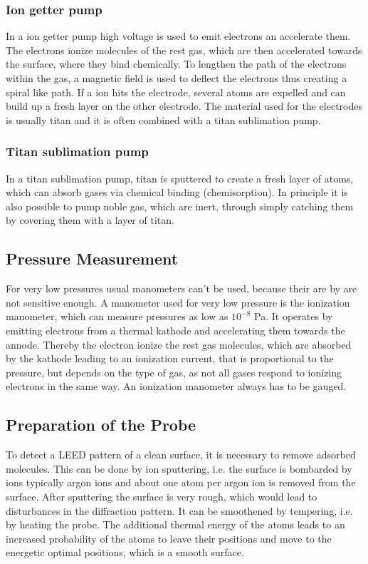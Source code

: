 \documentclass[a4paper]{scrartcl}
\numberwithin{equation}{section}
\numberwithin{figure}{section}
\numberwithin{table}{section}
\begin{document}
\subsubsection{Ion getter pump}
In a ion getter pump high voltage is used to emit electrons an accelerate them. The electrons ionize molecules of the rest gas, which are then accelerated towards the surface, where they bind chemically. To lengthen the path of the electrons within the gas, a magnetic field is used to deflect the electrons thus creating a spiral like path. If a ion hits the electrode, several atoms are expelled and can build up a fresh layer on the other electrode. The material used for the electrodes is usually titan and it is often combined with a titan sublimation pump.

\subsubsection{Titan sublimation pump}
In a titan sublimation pump, titan is sputtered to create a fresh layer of atoms, which can absorb gases via chemical binding (chemisorption). In principle it is also possible to pump noble gas, which are inert, through simply catching them by covering them with a layer of titan. 

\subsection{Pressure Measurement}
For very low pressures usual manometers can't be used, because their are by are not sensitive enough. A manometer used for very low pressure is the ionization manometer, which can measure pressures as low as $10^{-8}$ Pa. It operates by emitting electrons from a thermal kathode and accelerating them towards the annode. Thereby the electron ionize the rest gas molecules, which are absorbed by the kathode leading to an ionization current, that is proportional to the pressure, but depends on the type of gas, as not all gases respond to ionizing electrons in the same way. An ionization manometer always has to be gauged.

\subsection{Preparation of the Probe}
To detect a LEED pattern of a clean surface, it is necessary to remove adsorbed molecules. This can be done by ion sputtering, i.e. the surface is bombarded by ions typically argon ions and about one atom per argon ion is removed from the surface. After sputtering the surface is very rough, which would lead to disturbances in the diffraction pattern. It can be smoothened by tempering, i.e. by heating the probe. The additional thermal energy of the atoms leads to an increased probability of the atoms to leave their positions and move to the energetic optimal positions, which is a smooth surface.
\end{document}
